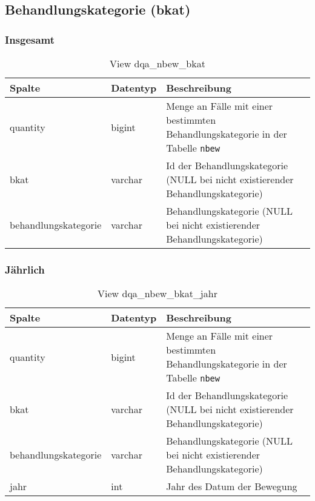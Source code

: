 \subsection{Behandlungskategorie (bkat)} \label{subsec:behKat}

\subsubsection{Insgesamt} \label{subsubsec:behKatI}

\begin{table}[ht]
	\centering   
	\caption{View dqa\_nbew\_bkat}
	\label{tab:beweBkatAll}
	\begin{tabular}{||l|l|p{10cm}||}   		
		\hline
		Spalte & Datentyp & Beschreibung \\ [0.5ex]
		\hline\hline
		quantity & bigint & Menge an Fälle mit einer bestimmten Behandlungskategorie in der Tabelle \texttt{nbew} \\
		\hline
		bkat & varchar & Id der Behandlungskategorie (NULL bei nicht existierender Behandlungskategorie)\\
		\hline
		behandlungskategorie & varchar & Behandlungskategorie (NULL bei nicht existierender Behandlungskategorie)\\
		\hline
		
	\end{tabular}
\end{table}

\subsubsection{Jährlich} \label{subsubsec:behKatJ}

\begin{table}[ht]
	\centering   
	\caption{View dqa\_nbew\_bkat\_jahr}
	\label{tab:beweBkatJahr}
	\begin{tabular}{||l|l|p{10cm}||}   		
		\hline
		Spalte & Datentyp & Beschreibung \\ [0.5ex]
		\hline\hline
		quantity & bigint & Menge an Fälle mit einer bestimmten Behandlungskategorie in der Tabelle \texttt{nbew} \\
		\hline
		bkat & varchar & Id der Behandlungskategorie (NULL bei nicht existierender Behandlungskategorie)\\
		\hline
		behandlungskategorie & varchar & Behandlungskategorie (NULL bei nicht existierender Behandlungskategorie)\\
		\hline
		jahr & int &  Jahr des Datum der Bewegung \\
		\hline
		
	\end{tabular}
\end{table}

